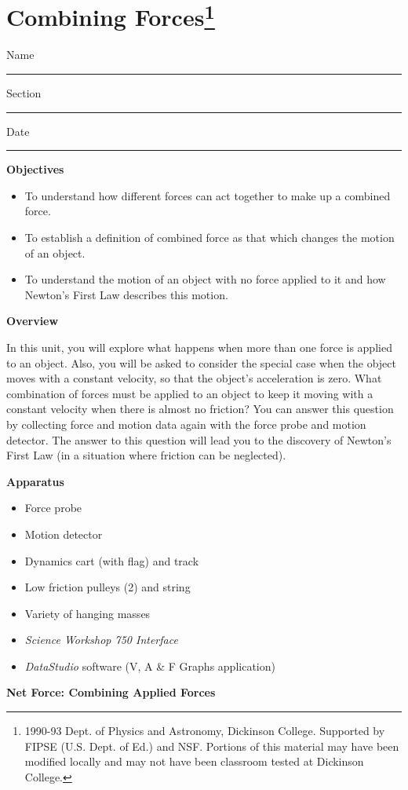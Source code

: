 
\section{Combining Forces\footnote{
1990-93 Dept. of Physics and Astronomy, Dickinson College. Supported by FIPSE
(U.S. Dept. of Ed.) and NSF. Portions of this material may have been modified
locally and may not have been classroom tested at Dickinson College.
}}

Name \rule{2.0in}{0.1pt}\hfill{}Section \rule{1.0in}{0.1pt}\hfill{}Date \rule{1.0in}{0.1pt}

\textbf{Objectives}

\begin{itemize}
\item To understand how different forces can act together to make up a combined force.~ 
\item To establish a definition of combined force as that which changes the motion
of an object.
\item To understand the motion of an object with no force applied to it and how Newton's
First Law describes this motion.
\end{itemize}
\textbf{Overview}

In this unit, you will explore what happens when more than one force is applied
to an object. Also, you will be asked to consider the special case when the
object moves with a constant velocity, so that the object's acceleration is
zero. What combination of forces must be applied to an object to keep it moving
with a constant velocity when there is almost no friction? You can answer this
question by collecting force and motion data again with the force probe and
motion detector. The answer to this question will lead you to the discovery
of Newton's First Law (in a situation where friction can be neglected).

\textbf{Apparatus}

\begin{itemize}
\item Force probe
\item Motion detector
\item Dynamics cart (with flag) and track
\item Low friction pulleys (2) and string
\item Variety of hanging masses
\item \textit{Science Workshop 750 Interface}
\item \textit{DataStudio} software (V, A \& F Graphs application)
\end{itemize}
\textbf{Net Force: Combining Applied Forces }

